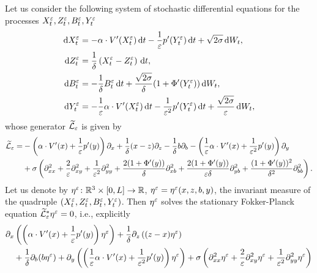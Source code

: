 \documentclass[review,onefignum,onetabnum]{siamonline190516}
\begin{document}
\begin{appendices}
	Let us consider the following system of stochastic differential equations for the processes $X_t^\varepsilon, Z_t^\varepsilon, B_t^\varepsilon, Y_t^\varepsilon$
	\begin{equation}
	\label{eq:systemSDEquadruple}
	\begin{aligned}
	\d X_t^\epl &= -\alpha \cdot V'(X_t^\epl) \dd t - \frac1\epl p'(Y_t^\epl) \dd t+ \sqrt{2\sigma} \dd W_t, \\
	\d Z_t^\epl &= \frac1\delta \left ( X^\epl_t - Z^\epl_t \right ) \dd t, \\
	\d B_t^\epl &= - \frac1\delta B_t^\epl \dd t + \frac{\sqrt{2\sigma}}{\delta}(1+\Phi'(Y_t^\epl)) \dd W_t, \\
	\d Y_t^\epl &= -\frac1\epl \alpha \cdot V'(X_t^\epl) \dd t - \frac{1}{\epl^2} p'(Y_t^\epl) \dd t+ \frac{\sqrt{2\sigma}}{\epl} \dd W_t,
	\end{aligned}
	\end{equation}
	whose generator $\widetilde{\mathcal L}_\varepsilon$ is given by
	\begin{equation}
	\begin{aligned}
	\widetilde{\mathcal L}_\varepsilon =& -\left( \alpha \cdot V'(x) + \frac1{\varepsilon} p'(y) \right) \partial_x + \frac1\delta (x-z) \partial_z - \frac1\delta b \partial_b - \left( \frac1{\varepsilon} \alpha \cdot V'(x) + \frac{1}{\varepsilon^2} p'(y) \right) \partial_y \\
	& + \sigma \left( \partial_{xx}^2 + \frac2{\varepsilon} \partial_{xy}^2 + \frac{1}{\varepsilon^2} \partial_{yy}^2 + \frac{2(1+\Phi'(y))}{\delta} \partial_{xb}^2 + \frac{2(1+\Phi'(y))}{\varepsilon \delta} \partial_{yb}^2 + \frac{(1+\Phi'(y))^2}{\delta^2} \partial_{bb}^2 \right).
	\end{aligned}
	\end{equation}
	Let us denote by $\eta^\varepsilon \colon \mathbb{R}^3 \times [0,L] \to \mathbb{R}$, $\eta^\varepsilon = \eta^\varepsilon(x,z,b,y)$, the invariant measure of the quadruple $(X_t^\varepsilon, Z_t^\varepsilon, B_t^\varepsilon, Y_t^\varepsilon)$. Then $\eta^\varepsilon$ solves the stationary Fokker-Planck equation $\widetilde{\mathcal L}_\varepsilon^* \eta^\varepsilon = 0$, i.e., explicitly
	\begin{equation} \label{eq:FPSDEquadruple}
	\begin{aligned}
	&\partial_x \left( \left( \alpha \cdot V'(x) + \frac1\epl p'(y) \right) \eta^\epl \right) + \frac1\delta\partial_z \left( (z-x) \eta^\epl \right) \\
	&\quad + \frac1\delta \partial_b (b\eta^\epl)  + \partial_y \left( \left( \frac1\epl \alpha \cdot V'(x) + \frac{1}{\epl^2} p'(y) \right) \eta^\epl \right) + \sigma \left( \partial_{xx}^2 \eta^\epl + \frac2\epl \partial_{xy}^2 \eta^\epl + \frac1{\epl^2} \partial_{yy}^2 \eta^\epl \right) \\

\end{aligned}
\end{equation}
\end{appendices}
\end{document}
